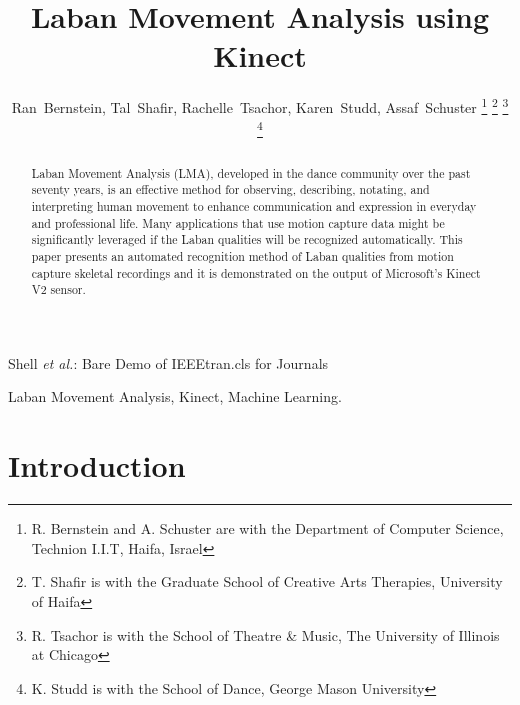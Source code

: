\documentclass[journal]{journal}
\begin{document}
\nocite{*}

\title{Laban Movement Analysis using Kinect}

\author{Ran~Bernstein, Tal~Shafir, Rachelle~Tsachor, Karen~Studd,
Assaf~Schuster
\thanks{R. Bernstein and A. Schuster are with the Department of Computer
Science, Technion I.I.T, Haifa, Israel}
\thanks{T. Shafir is with the Graduate School of Creative Arts Therapies,
University of Haifa}
\thanks{R. Tsachor is with the School of Theatre \& Music, The University of
Illinois at Chicago}
\thanks{K. Studd is with the School of Dance, George Mason University}}
{Shell \MakeLowercase{\textit{et al.}}: Bare Demo of IEEEtran.cls for Journals}
\maketitle
\thispagestyle{empty}





\begin{abstract}
Laban Movement Analysis (LMA), developed in the dance community
over the past seventy years, is an effective method for observing, describing, notating, and interpreting human
movement to enhance communication and expression in everyday and professional life.
Many applications that use motion capture data might be significantly
leveraged if the Laban qualities will be recognized automatically.
This paper presents an automated recognition method of Laban qualities from
motion capture skeletal recordings and it is demonstrated on the output of
Microsoft's Kinect V2 sensor.
\end{abstract}

\begin{IEEEkeywords}
Laban Movement Analysis, Kinect, Machine Learning.
\end{IEEEkeywords}

\IEEEpeerreviewmaketitle



\section{Introduction}
\end{document}

